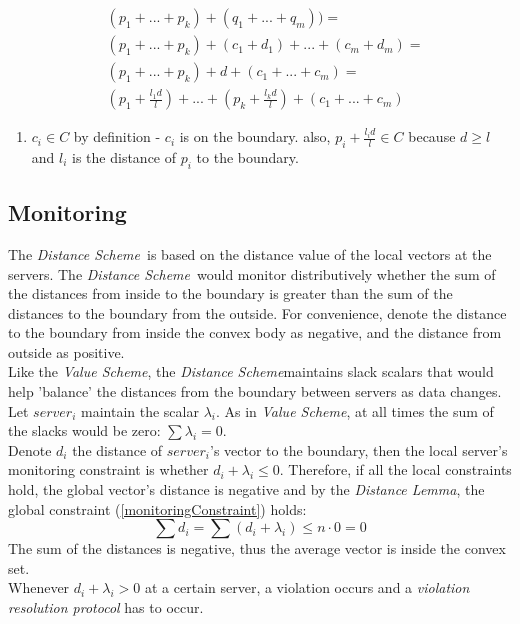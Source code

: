 \documentclass[10pt, conference]{IEEEtran}
\newcommand{\valueScheme}{\textit{Value Scheme}}
\newcommand{\distanceScheme}{\textit{Distance Scheme}}
\begin{document}
\begin{equation}
\begin{aligned}
&( p_1+...+p_k) + (q_1+...+q_m)) = \\
&( p_1+...+p_k) + (c_1+d_1) + ... + (c_m + d_m) = \\
&( p_1+...+p_k) + d + (c_1 + ... + c_m) = \\
&\left( p_1 + \frac{l_1 d}{l}\right) + ... + \left(p_k + \frac{l_k d}{l}\right) + (c_1 + ... + c_m)
\end{aligned}
\end{equation}
\begin{enumerate}
\item[\ ] $c_i  \in C$ by definition - $c_i$ is on the boundary. also, $p_i + \frac{l_i d}{l} \in C$ because $d \geq l$ and $l_i$ is the distance of $p_i$ to the boundary.
\end{enumerate}
\subsection{Monitoring}
The \distanceScheme \ is based on the distance value of the local vectors at the servers. The \distanceScheme \ would monitor distributively whether the sum of the distances from inside to the boundary is greater than the sum of the distances to the boundary from the outside. For convenience, denote the distance to the boundary from inside the convex body as negative, and the distance from outside as positive. \\
Like the \valueScheme , the \distanceScheme maintains slack scalars that would help 'balance' the distances from the boundary between servers as data changes. Let $server_i$ maintain the scalar $\lambda _i$. As in \valueScheme , at all times the sum of the slacks would be zero: $\sum {\lambda _i} = 0$. \\
Denote $d_i$ the distance of $server_i$'s vector to the boundary, then the local server's monitoring constraint is whether $d_i + \lambda_i \leq 0$. Therefore, if all the local constraints hold, the global vector's distance is negative and by the \textit{Distance Lemma}, the global constraint (\ref{monitoringConstraint}) holds:
\begin{equation}
\sum{d_i} = \sum{(d_i + \lambda _i)} \leq n \cdot 0 = 0
\end{equation}
The sum of the distances is negative, thus the average vector is inside the convex set. \\
Whenever $d_i + \lambda _i > 0$ at a certain server, a violation occurs and a  \textit{violation resolution protocol} has to occur. 
\end{document}
